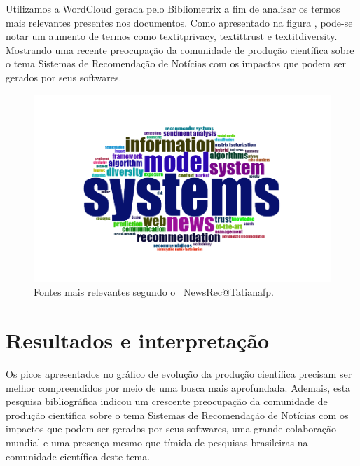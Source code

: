 Utilizamos a WordCloud gerada pelo Bibliometrix a fim de analisar os termos mais relevantes presentes nos documentos. Como apresentado na figura , pode-se notar um aumento de termos como textit{privacy}, textit{trust} e textit{diversity}. Mostrando uma recente preocupação da comunidade de produção científica  sobre o tema Sistemas de Recomendação de Notícias com os impactos que podem ser gerados por seus softwares. 

\begin{figure}
    \centering
    \includegraphics[width=1\textwidth]{experiments/Tatianafp/PesquisaBibliometrica/images/WordCloudDocuments.png}
    \caption{Fontes mais relevantes segundo o \dataset\ NewsRec@Tatianafp.}
    \label{fig:wordloud_NewsRec_Tatianafp}
\end{figure}

\section{Resultados e interpretação}

Os picos apresentados no gráfico de evolução da produção científica precisam ser melhor compreendidos por meio de uma busca mais aprofundada. Ademais, esta pesquisa bibliográfica indicou um crescente preocupação da comunidade de produção científica  sobre o tema Sistemas de Recomendação de Notícias com os impactos que podem ser gerados por seus softwares, uma grande colaboração mundial e uma presença mesmo que tímida de pesquisas brasileiras na comunidade científica deste tema. 